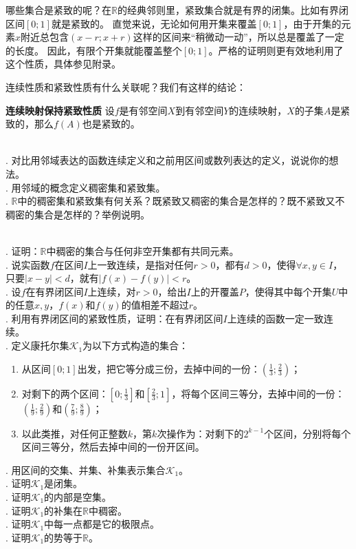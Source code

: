 \documentclass[12pt,UTF8]{ctexbook}
\begin{document}
哪些集合是紧致的呢？在$\mathbb{R}$的经典邻则里，紧致集合就是有界的闭集。比如有界闭区间$[0;1]$就是紧致的。
直觉来说，无论如何用开集来覆盖$[0;1]$，由于开集的元素$x$附近总包含$(x-r;x+r)$这样的区间来“稍微动一动”，所以总是覆盖了一定的长度。
因此，有限个开集就能覆盖整个$[0;1]$。严格的证明则更有效地利用了这个性质，具体参见附录。

连续性质和紧致性质有什么关联呢？我们有这样的结论：
\begin{tm}{\textbf{连续映射保持紧致性质}}
    设$f$是有邻空间$X$到有邻空间$Y$的连续映射，$X$的子集$A$是紧致的，那么$f(A)$也是紧致的。
\end{tm}

\begin{sk}
    \mbox{} \\
    . 对比用邻域表达的函数连续定义和之前用区间或数列表达的定义，说说你的想法。\\
    . 用邻域的概念定义稠密集和紧致集。\\
    . $\mathbb{R}$中的稠密集和紧致集有何关系？既紧致又稠密的集合是怎样的？既不紧致又不稠密的集合是怎样的？举例说明。
\end{sk}

\begin{xt}
    \mbox{} \\
    . 证明：$\mathbb{R}$中稠密的集合与任何非空开集都有共同元素。\\
    . 说实函数$f$在区间$I$上一致连续，是指对任何$r>0$，都有$d>0$，使得$\forall x, y\in I$，只要$|x-y|<d$，就有$|f(x) - f(y)| < r$。\\
    . 设$f$在有界闭区间$I$上连续，对$r>0$，给出$I$上的开覆盖$P$，使得其中每个开集$U$中的任意$x,y$，$f(x)$和$f(y)$的值相差不超过$r$。\\
    . 利用有界闭区间的紧致性质，证明：在有界闭区间$I$上连续的函数一定一致连续。\\
    . 定义康托尔集$\mathcal{K}_1$为以下方式构造的集合：
    \begin{enumerate}
        \item 从区间$[0;1]$出发，把它等分成三份，去掉中间的一份：$\left(\frac{1}{3};\frac{2}{3}\right)$；
        \item 对剩下的两个区间：$\left[0;\frac{1}{3}\right]$和$\left[\frac{2}{3};1\right]$，将每个区间三等分，去掉中间的一份：$\left(\frac{1}{9};\frac{2}{9}\right)$和$\left(\frac{7}{9};\frac{8}{9}\right)$；
        \item 以此类推，对任何正整数$k$，第$k$次操作为：对剩下的$2^{k-1}$个区间，分别将每个区间三等分，然后去掉中间的一份开区间。
    \end{enumerate}
    . 用区间的交集、并集、补集表示集合$\mathcal{K}_1$。\\
    . 证明$\mathcal{K}_1$是闭集。\\
    . 证明$\mathcal{K}_1$的内部是空集。\\
    . 证明$\mathcal{K}_1$的补集在$\mathbb{R}$中稠密。\\
    . 证明$\mathcal{K}_1$中每一点都是它的极限点。\\
    . 证明$\mathcal{K}_1$的势等于$\mathbb{R}$。
\end{xt}
\end{document}
